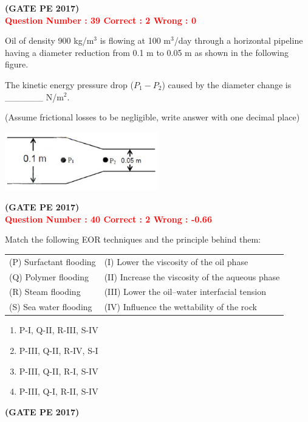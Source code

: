 \documentclass[journal,12pt,onecolumn]{article}
\begin{document}
{\hfill\textbf{(GATE PE 2017)}\\[0.6cm]

\textcolor{red}{\textbf{Question Number : 39 \hfill Correct : 2  Wrong : 0}}

Oil of density 900 kg/m$^3$ is flowing at 100 m$^3$/day through a horizontal pipeline having a diameter reduction from 0.1 m to 0.05 m as shown in the following figure.

The kinetic energy pressure drop ($P_1 - P_2$) caused by the diameter change is \_\_\_\_\_\_ N/m$^2$.

(Assume frictional losses to be negligible, write answer with one decimal place)

\begin{center}
    \includegraphics[width=0.5\textwidth]{Figs/figQ_39.png}
\end{center}

\hfill\textbf{(GATE PE 2017)}\\[0.6cm]


\textcolor{red}{\textbf{Question Number : 40 \hfill Correct : 2  Wrong : -0.66}}

Match the following EOR techniques and the principle behind them:

\begin{tabular}{ll}
(P) Surfactant flooding & (I) Lower the viscosity of the oil phase \\
(Q) Polymer flooding & (II) Increase the viscosity of the aqueous phase \\
(R) Steam flooding & (III) Lower the oil–water interfacial tension \\
(S) Sea water flooding & (IV) Influence the wettability of the rock \\
\end{tabular}

\begin{enumerate}[label=(\Alph*)]
    \item P-I, Q-II, R-III, S-IV \\
    \item P-III, Q-II, R-IV, S-I \\
    \item P-III, Q-II, R-I, S-IV \\
    \item P-III, Q-I, R-II, S-IV
\end{enumerate}
\hfill\textbf{(GATE PE 2017)}\\[0.6cm]

}
\end{document}
